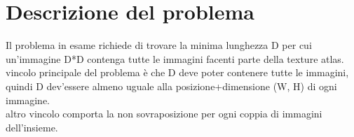 





	\section{Descrizione del problema}


 
Il problema in esame richiede di trovare la minima lunghezza D per cui un'immagine D*D contenga tutte le immagini facenti parte della texture atlas. \\
vincolo principale del problema è che D deve poter contenere tutte le immagini, quindi D dev'essere almeno uguale alla posizione+dimensione (W, H) di ogni immagine. \\
altro vincolo comporta la non sovraposizione per ogni coppia di immagini dell'insieme. \\



	\newpage